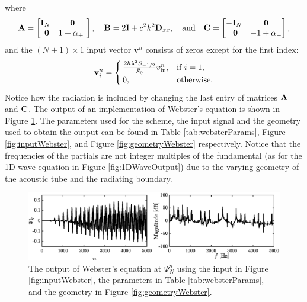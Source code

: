 where 
\begin{equation*}
    \begin{gathered}
    \mathbf{A} = \begin{bmatrix}
        \mathbf{I}_{N}& \mathbf{0}\\\
        \mathbf{0} & 1 + \alpha_+\
    \end{bmatrix}, \quad \mathbf{B} = 2\mathbf{I} + c^2 k^2 \mathbf{D}_{xx}, \quad \text{and} \quad \mathbf{C} = \begin{bmatrix}
        -\mathbf{I}_N & \mathbf{0}\\\
        \mathbf{0}& -1 + \alpha_-
    \end{bmatrix},
    \end{gathered}
\end{equation*}
and the $(N+1)\times 1$ input vector $\mathbf{v}^n$ consists of zeros except for the first index:
\begin{equation}
    \mathbf{v}_i^n = 
    \begin{cases}
        \frac{2h \lambda^2 S_{-1/2}}{\bar{S}_0}v_\text{in}^n, & \text{if } i = 1,\\
        0,& \text{otherwise}.
    \end{cases}
\end{equation}
%
Notice how the radiation is included by changing the last entry of matrices $\mathbf{A}$ and $\mathbf{C}$.
The output of an implementation of Webster's equation is shown in Figure \ref{fig:outputWebster}. The parameters used for the scheme, the input signal and the geometry used to obtain the output can be found in Table \ref{tab:websterParams}, Figure \ref{fig:inputWebster}, and Figure \ref{fig:geometryWebster} respectively. Notice that the frequencies of the partials are not integer multiples of the fundamental (as for the 1D wave equation in Figure \ref{fig:1DWaveOutput}) due to the varying geometry of the acoustic tube and the radiating boundary.  
\begin{figure}[h]
    \centering
    \includegraphics[width=\textwidth]{figures/resonators/brass/outputWebster.eps}
    \caption{The output of Webster's equation at $\Psi_N^n$ using the input in Figure \ref{fig:inputWebster}, the parameters in Table \ref{tab:websterParams}, and the geometry in Figure \ref{fig:geometryWebster}. \label{fig:outputWebster}}
\end{figure}

